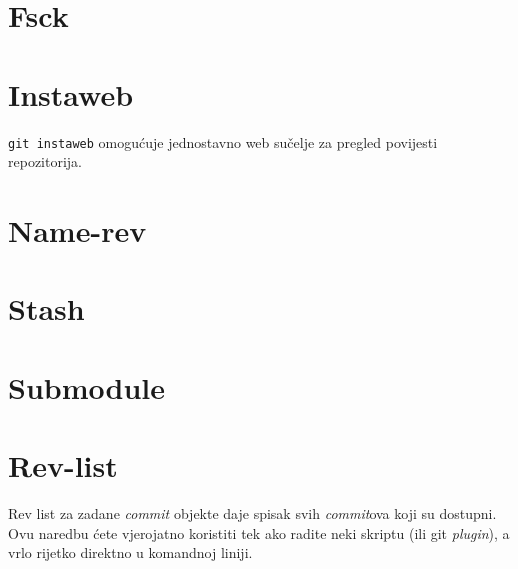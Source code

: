 \section*{Fsck}

\TODO

\section*{Instaweb}

\verb+git instaweb+ omogućuje jednostavno web sučelje za pregled povijesti repozitorija.

\section*{Name-rev}

\TODO

\section*{Stash}

\TODO

\section*{Submodule}

\TODO

\section*{Rev-list}

Rev list za zadane \emph{commit} objekte daje spisak svih \emph{commit}ova koji su dostupni.
Ovu naredbu ćete vjerojatno koristiti tek ako radite neki skriptu (ili git \emph{plugin}), a vrlo rijetko direktno u komandnoj liniji.

